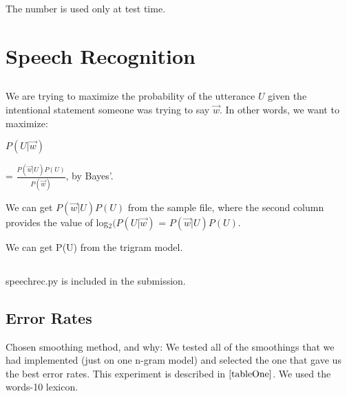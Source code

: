 \documentclass[12pt, letterpaper]{article}
\begin{document}
The number is used only at test time.

\section{Speech Recognition}
\subsection{}


We are trying to maximize the probability of the utterance $U$ given the intentional statement someone was trying to say $\overrightarrow{w}$. In other words, we want to maximize: 

$P(U|\overrightarrow{w})$

= $\frac{P(\overrightarrow{w}|U) P(U)}{P(\overrightarrow{w})}$, by Bayes'.

We can get $P(\overrightarrow{w}|U) P(U)$ from the sample file, where the second column provides the value of log$_{2}(P(U|\overrightarrow{w})$ = $P(\overrightarrow{w}|U) P(U)$.

We can get P(U) from the trigram model. 

\subsection{}
speechrec.py is included in the submission.

\subsection{Error Rates}

Chosen smoothing method, and why: We tested all of the smoothings that we had implemented (just on one n-gram model) and selected the one that gave us the best error rates. This experiment is described in $\ref{tableOne}$. We used the words-10 lexicon.
\end{document}
